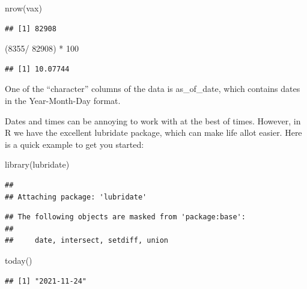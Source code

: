 \documentclass[
]{article}
\newenvironment{Shaded}{\begin{snugshade}}{\end{snugshade}}
\newcommand{\DecValTok}[1]{\textcolor[rgb]{0.00,0.00,0.81}{#1}}
\newcommand{\FunctionTok}[1]{\textcolor[rgb]{0.00,0.00,0.00}{#1}}
\newcommand{\NormalTok}[1]{#1}
\newcommand{\SpecialCharTok}[1]{\textcolor[rgb]{0.00,0.00,0.00}{#1}}
\begin{document}
\begin{Shaded}
\begin{Highlighting}[]
\FunctionTok{nrow}\NormalTok{(vax)}
\end{Highlighting}
\end{Shaded}

\begin{verbatim}
## [1] 82908
\end{verbatim}

\begin{Shaded}
\begin{Highlighting}[]
\NormalTok{(}\DecValTok{8355}\SpecialCharTok{/} \DecValTok{82908}\NormalTok{) }\SpecialCharTok{*} \DecValTok{100}
\end{Highlighting}
\end{Shaded}

\begin{verbatim}
## [1] 10.07744
\end{verbatim}

One of the ``character'' columns of the data is as\_of\_date, which
contains dates in the Year-Month-Day format.

Dates and times can be annoying to work with at the best of times.
However, in R we have the excellent lubridate package, which can make
life allot easier. Here is a quick example to get you started:

\begin{Shaded}
\begin{Highlighting}[]
\FunctionTok{library}\NormalTok{(lubridate)}
\end{Highlighting}
\end{Shaded}

\begin{verbatim}
## 
## Attaching package: 'lubridate'
\end{verbatim}

\begin{verbatim}
## The following objects are masked from 'package:base':
## 
##     date, intersect, setdiff, union
\end{verbatim}

\begin{Shaded}
\begin{Highlighting}[]
\FunctionTok{today}\NormalTok{()}
\end{Highlighting}
\end{Shaded}

\begin{verbatim}
## [1] "2021-11-24"
\end{verbatim}
\end{document}
